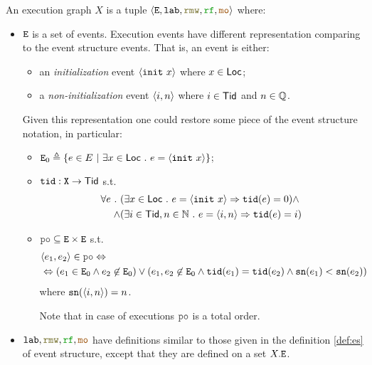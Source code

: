 \documentclass[12pt]{article}
\begin{document}
\begin{definition}
  An execution graph $X$ is a tuple $\tup{\lE, \lLAB, \lRMW, \lRF, \lMO}$ where:
  \begin{itemize}

  \item ${\mathtt{E}}$ is a set of events. 
    Execution events have different representation comparing to the event structure events. 
    That is, an event is either:
    \begin{itemize}
      \item an \emph{initialization} event $\langle {\mathtt{init}}~x \rangle$ where $x \in \mathsf{Loc}$;
      \item a \emph{non-initialization} event $\langle i, n \rangle$ where $i \in \mathsf{Tid}$ and $n \in {\mathbb{Q}}$.
    \end{itemize}
    Given this representation one could restore some piece of the event structure notation, 
    in particular:
    \begin{itemize}

      \item ${\mathtt{E}}_{0} \triangleq \{e \in E ~|~ \exists{x} \in \mathsf{Loc} ~.~ e = \langle {\mathtt{init}}~x \rangle\}$;

      \item ${\mathtt{tid}} : {\mathtt{X}} \rightarrow \mathsf{Tid}$ s.t. \\
        \begin{equation*}
          \begin{split}
            \forall{e} ~.~
            & (\exists{x \in \mathsf{Loc}} ~.~ e = \langle {\mathtt{init}}~x \rangle \Rightarrow {\mathtt{tid}}(e) = 0) \wedge \\ \wedge
            & (\exists{i \in \mathsf{Tid}, n \in {\mathbb{N}}} ~.~ e = \langle i, n \rangle \Rightarrow {\mathtt{tid}}(e) = i)
          \end{split}
        \end{equation*}
        
      \item $\lPO \subseteq \lE \times \lE$ s.t. \\
        \begin{equation*}
          \begin{split}
            & \tup{e_1, e_2} \in \lPO \Leftrightarrow \\
            & \Leftrightarrow (e_1 \in \lEo \wedge e_2 \not\in \lEo) \vee 
              (e_1, e_2 \not\in \lEo \wedge \lTID(e_1) = \lTID(e_2) \wedge
              \lSN(e_1) < \lSN(e_2))
          \end{split}
        \end{equation*}
        where ${\mathtt{sn}}(\langle i, n \rangle) = n$.

        Note that in case of executions $\lPO$ is a total order.
    \end{itemize}
    
  \item $\lLAB, \lRMW, \lRF, \lMO$ have definitions similar to those given
    in the definition \ref{def:es} of event structure,
    except that they are defined on a set $X.{\mathtt{E}}$.

  \end{itemize}
\end{definition}
\end{document}
